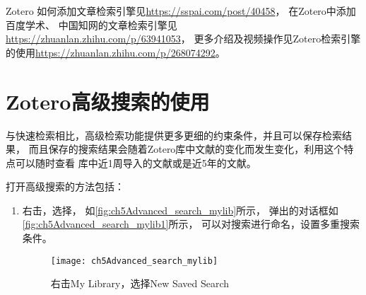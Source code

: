 \documentclass[cn,11pt,chinese]{elegantbook}
\begin{document}
		Zotero 如何添加文章检索引擎见\url{https://sspai.com/post/40458}，
		在Zotero中添加百度学术、
		中国知网的文章检索引擎见\url{https://zhuanlan.zhihu.com/p/63941053}，
		更多介绍及视频操作见Zotero检索引擎的使用\url{https://zhuanlan.zhihu.com/p/268074292}。



		
		\section{Zotero高级搜索的使用}\label{sec:Advanced_search}
		与快速检索相比，高级检索功能提供更多更细的约束条件，并且可以保存检索结果，
		而且保存的搜索结果会随着Zotero库中文献的变化而发生变化，利用这个特点可以随时查看
		库中近1周导入的文献或是近5年的文献。

		打开高级搜索的方法包括：
				\begin{enumerate}
					\item 右击，选择，
					如\autoref{fig:ch5Advanced_search_mylib}所示，
					弹出的对话框如\autoref{fig:ch5Advanced_search_mylib1}所示，
					可以对搜索进行命名，设置多重搜索条件。
						\begin{figure}[ht]
							\centering
							\texttt{[image: ch5Advanced\_search\_mylib]}
							\caption{右击My Library，选择New Saved Search}
							\label{fig:ch5Advanced_search_mylib}
						\end{figure}
						

\end{enumerate}
\end{document}
